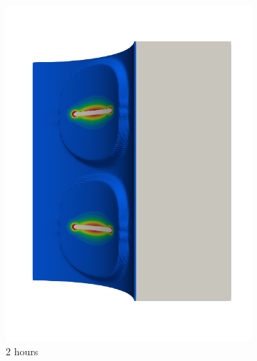 \begin{figure}[!htb]
\begin{subfigure}[b]{0.2\textwidth}
    \includegraphics[width=\textwidth]{Chapter5/figures/spallation/seed_ep_6}
    \caption{2 hours}
  \end{subfigure}
  \begin{subfigure}[b]{0.2\textwidth}
    \centering

\end{subfigure}
\end{figure}
